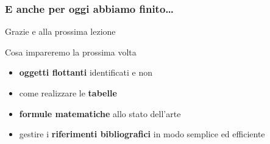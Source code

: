 \documentclass[svgnames,%
	ucs,%
	pdftex]{guitbeamer}
\begin{document}
\begin{frame}
  \frametitle{E anche per oggi abbiamo finito\dots}
	\begin{center}
	  \huge
		Grazie e alla prossima lezione
	\end{center}
  \medskip
	\begin{block}{Cosa impareremo la prossima volta}
		\begin{itemize}
			\item \textbf{oggetti flottanti} identificati e non 
			\item come realizzare le \textbf{tabelle} 
			\item \textbf{formule matematiche} allo stato dell'arte
			\item gestire i \textbf{riferimenti bibliografici} in modo semplice ed efficiente
		\end{itemize}
	\end{block}
\end{frame}
\end{document}
